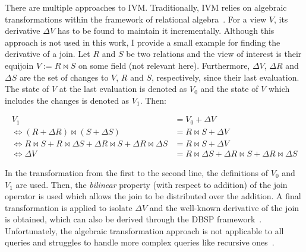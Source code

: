 There are multiple approaches to \ac{IVM}.
Traditionally, \ac{IVM} relies on algebraic transformations within the framework
of relational algebra~\cite{gupta1995maintenance, gupta1993maintaining, pgivm}.
For a view \(V\), its derivative \(\Delta V\) has to be found to maintain
it incrementally.
Although this approach is not used in this work, I provide a small example
for finding the derivative of a join.
Let \(R\) and \(S\) be two relations and the view of interest is their
equijoin \(V := R \bowtie S\) on some field (not relevant here).
Furthermore, \(\Delta V\), \(\Delta R\) and \(\Delta S\) are the set of changes
to \(V\), \(R\) and \(S\), respectively, since their last evaluation.
The state of \(V\) at the last evaluation is denoted as \(V_0\) and the
state of \(V\) which includes the changes is denoted as \(V_1\). Then:

\begin{equation}
    \begin{aligned}
        V_1                                                                                               & = V_0 + \Delta V                                                      \\
        \Leftrightarrow (R + \Delta R) \bowtie (S + \Delta S)                                             & = R \bowtie S + \Delta V                                              \\
        \Leftrightarrow R \bowtie S + R \bowtie \Delta S + \Delta R \bowtie S + \Delta R \bowtie \Delta S & = R \bowtie S + \Delta V                                              \\
        \Leftrightarrow \Delta V                                                                          & = R \bowtie \Delta S + \Delta R \bowtie S + \Delta R \bowtie \Delta S
    \end{aligned}
\end{equation}

In the transformation from the first to the second line, the definitions
of \(V_0\) and \(V_1\) are used.
Then, the \emph{bilinear} property (with respect to addition) of the join
operator is used which allows the join to be distributed over the addition.
A final transformation is applied to isolate \(\Delta V\) and the well-known
derivative of the join~\cite{idris2017dynamic} is obtained, which can also be
derived through the DBSP framework~\cite{budiu2025dbsp}.
Unfortunately, the algebraic transformation approach is not applicable
to all queries and struggles to handle more complex queries like
recursive ones~\cite{budiu2025dbsp}.

